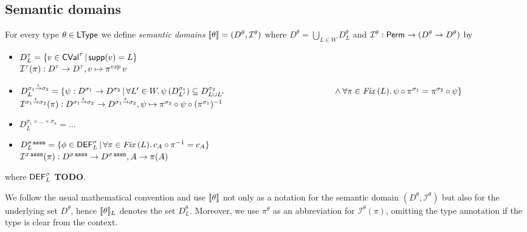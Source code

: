 \documentclass[12pt,a4paper]{report}
\newcommand{\CVal}{\sstyle{CVal}}
\newcommand{\sexp}{\nstyle{exp}}
\newcommand{\DEF}{\sstyle{DEF}}
\newcommand{\I}{\mathcal{I}}
\newcommand{\Fix}[1]{\nstyle{Fix}\,(#1)}
\begin{document}

\subsection{Semantic domains}

\begin{definition}
  For every type $\theta\in\mathsf{LType}$ we define {\em semantic domains}
  $\semantic{\theta} = (D^\theta,\I^\theta)$ where
  $D^\theta = \bigcup_{L \in W} D^\theta_L$ and $\I^\theta: \Perm \to (D^\theta \to D^\theta)$ by
  \begin{itemize}
    \item $D^\tau_L = \{v\in\CVal^\tau\,|\,\supp{v} = L\}$ \\
          $\I^\tau(\pi): D^\tau \to D^\tau, v \mapsto \pi^\sexp\,v$
    \item $D^{\ttarrow{\sigma_1}{\sigma_2}}_L = \{\psi: D^{\sigma_1} \to D^{\sigma_2}\,|\,
              \forall L'\in W.\,\psi\,(D^{\sigma_1}_{L'}) \subseteq D^{\sigma_2}_{L \cup L'} \\
              \hspace*{4.5cm} \wedge \forall \pi\in\Fix{L}.\,\psi\circ\pi^{\sigma_1}=\pi^{\sigma_2}\circ\psi\}$\\
          $\I^{\ttarrow{\sigma_1}{\sigma_2}}(\pi):D^{\ttarrow{\sigma_1}{\sigma_2}}\to D^{\ttarrow{\sigma_1}{\sigma_2}},
                              \psi \mapsto \pi^{\sigma_2} \circ \psi \circ (\pi^{\sigma_1})^{-1}$
    \item $D^{\sigma_1 \times \ldots \times \sigma_n}_L = \ldots$
    \item $D^{\sigma\,\tassn}_L =
      \{\phi\in\DEF^{\sigma}_L\,|\,\forall \pi\in\Fix{L}.\,c_A
      \circ \pi^{-1} = c_A\}$ \\
      $\I^{\sigma\,\tassn}(\pi):D^{\sigma\,\tassn}\to
      D^{\sigma\,\tassn}, A \to \pi(A)$
  \end{itemize}
  where $\DEF_L^{\sigma}$ {\bf TODO}.
\end{definition}

We follow the usual mathematical convention and use $\llbracket\theta\rrbracket$ not only as a notation
for the semantic domain $(D^\theta,\I^\theta)$ but also for the underlying set $D^\theta$,
hence $\llbracket\theta\rrbracket_L$ denotes the set $D^\theta_L$. Moreover, we use $\pi^\theta$ as an abbreviation
for $\I^\theta(\pi)$, omitting the type annotation if the type is
clear from the context.
\end{document}
